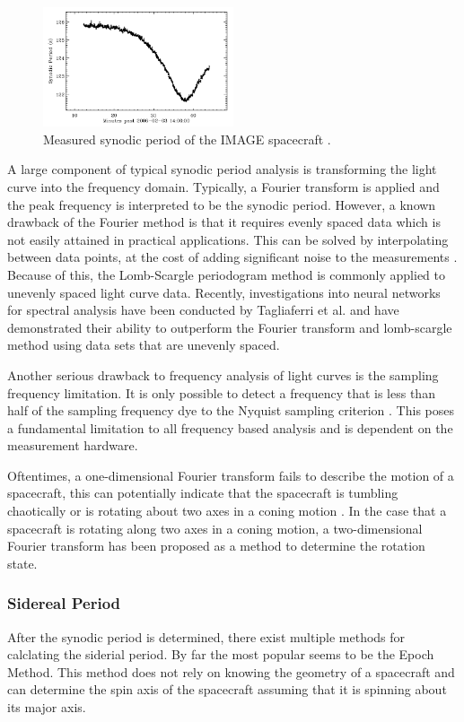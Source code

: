 \documentclass{article}
\begin{document}
\begin{figure}[h]
	\centering
	\includegraphics[width=0.5\textwidth]{synodic_period_AMOS}
	\caption{Measured synodic period of the IMAGE spacecraft \cite{AMOS}.}
\end{figure}

A large component of typical synodic period analysis is transforming the light curve into the frequency domain. Typically, a Fourier transform is applied and the peak frequency is interpreted to be the synodic period. However, a known drawback of the Fourier method is that it requires evenly spaced data which is not easily attained in practical applications. This can be solved by interpolating between data points, at the cost of adding significant noise to the measurements \cite{Tagliaferri}. Because of this, the Lomb-Scargle periodogram method is commonly applied to unevenly spaced light curve data. Recently, investigations into neural networks for spectral analysis have been conducted by Tagliaferri et al. \cite{Tagliaferri} and have demonstrated their ability to outperform the Fourier transform and lomb-scargle method using data sets that are unevenly spaced.

Another serious drawback to frequency analysis of light curves is the sampling frequency limitation. It is only possible to detect a frequency that is less than half of the sampling frequency dye to the Nyquist sampling criterion \cite{SILHA2018844}. This poses a fundamental limitation to all frequency based analysis and is dependent on the measurement hardware. 

Oftentimes, a one-dimensional Fourier transform fails to describe the motion of a spacecraft, this can potentially indicate that the spacecraft is tumbling chaotically or is rotating about two axes in a coning motion \cite{Hall2014OpticalCO}. In the case that a spacecraft is rotating along two axes in a coning motion, a two-dimensional Fourier transform has been proposed as a method to determine the rotation state.

\subsubsection{Sidereal Period}
After the synodic period is determined, there exist multiple methods for calclating the siderial period. By far the most popular seems to be the Epoch Method. This method does not rely on knowing the geometry of a spacecraft and can determine the spin axis of the spacecraft assuming that it is spinning about its major axis. 
\end{document}
